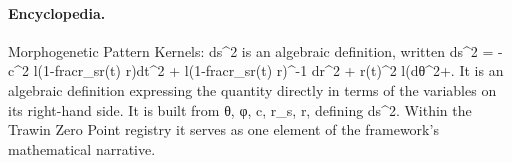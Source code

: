 \paragraph{Encyclopedia.}
Morphogenetic Pattern Kernels: ds\textasciicircum{}2 is an algebraic definition, written ds\textasciicircum{}2 = -c\textasciicircum{}2 l(1-fracr\_sr(t) r)dt\textasciicircum{}2 + l(1-fracr\_sr(t) r)\textasciicircum{}-1 dr\textasciicircum{}2 + r(t)\textasciicircum{}2 l(dθ\textasciicircum{}2+. It is an algebraic definition expressing the quantity directly in terms of the variables on its right-hand side. It is built from θ, φ, c, r\_s, r, defining ds\textasciicircum{}2. Within the Trawin Zero Point registry it serves as one element of the framework's mathematical narrative.
